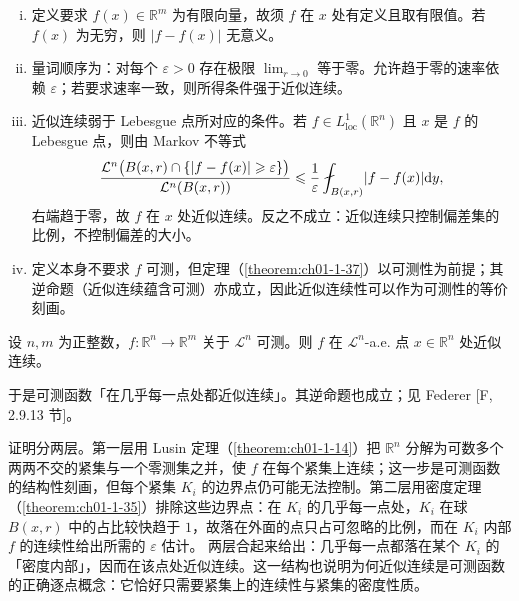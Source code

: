 \documentclass[../../main.tex]{subfiles}%
\begin{document}
\begin{remark}\label{remark:ch01-def-1-29-条件}
\begin{enumerate}[(i)]
\item 定义要求 $f(x)\in\mathbb{R}^m$ 为有限向量，故须 $f$ 在 $x$ 处有定义且取有限值。若 $f(x)$ 为无穷，则 $\lvert f-f(x)\rvert$ 无意义。
\item 量词顺序为：对每个 $\varepsilon>0$ 存在极限 $\lim_{r\to0}$ 等于零。允许趋于零的速率依赖 $\varepsilon$；若要求速率一致，则所得条件强于近似连续。
\item 近似连续弱于 Lebesgue 点所对应的条件。若 $f\in L^{1}_{\mathrm{loc}}(\mathbb{R}^n)$ 且 $x$ 是 $f$ 的 Lebesgue 点，则由 Markov 不等式
\begin{align*}
\frac{\mathcal{L}^{n}\bigl(B(x,r)\cap\{\lvert f-f(x)\rvert\geqslant\varepsilon\}\bigr)}{\mathcal{L}^{n}(B(x,r))}
\leqslant\frac{1}{\varepsilon}\fint_{B(x,r)}\lvert f-f(x)\rvert\diff y ,
\end{align*}
右端趋于零，故 $f$ 在 $x$ 处近似连续。反之不成立：近似连续只控制偏差集的比例，不控制偏差的大小。
\item 定义本身不要求 $f$ 可测，但定理（\cref{theorem:ch01-1-37}）以可测性为前提；其逆命题（近似连续蕴含可测）亦成立，因此近似连续性可以作为可测性的等价刻画。%
\end{enumerate}
\end{remark}

\begin{theorem}[可测性与近似连续]\label{theorem:ch01-1-37}
设 $n,m$ 为正整数，$f:\mathbb{R}^n\to\mathbb{R}^m$ 关于 $\mathcal{L}^{n}$ 可测。则 $f$ 在 $\mathcal{L}^{n}$-a.e. 点 $x\in\mathbb{R}^n$ 处近似连续。
\end{theorem}

\begin{remark}\label{remark:ch01-thm-1-37-实用连续}
于是可测函数「在几乎每一点处都近似连续」。其逆命题也成立；见 Federer [F, 2.9.13 节]。
\end{remark}

\begin{remark}\label{remark:ch01-thm-1-37-动机}
证明分两层。第一层用 Lusin 定理（\cref{theorem:ch01-1-14}）把 $\mathbb{R}^n$ 分解为可数多个两两不交的紧集与一个零测集之并，使 $f$ 在每个紧集上连续；这一步是可测函数的结构性刻画，但每个紧集 $K_i$ 的边界点仍可能无法控制。第二层用密度定理（\cref{theorem:ch01-1-35}）排除这些边界点：在 $K_i$ 的几乎每一点处，$K_i$ 在球 $B(x,r)$ 中的占比较快趋于 $1$，故落在外面的点只占可忽略的比例，而在 $K_i$ 内部 $f$ 的连续性给出所需的 $\varepsilon$ 估计。%
两层合起来给出：几乎每一点都落在某个 $K_i$ 的「密度内部」，因而在该点处近似连续。这一结构也说明为何近似连续是可测函数的正确逐点概念：它恰好只需要紧集上的连续性与紧集的密度性质。
\end{remark}
\end{document}
